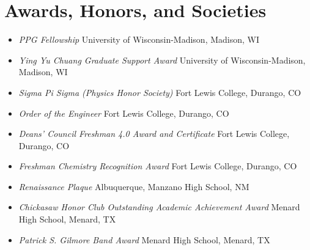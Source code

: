 \section{Awards, Honors, and Societies}

\begin{itemize}
    \item \textit{PPG Fellowship} \hfill University of Wisconsin-Madison, Madison, WI
    \item \textit{Ying Yu Chuang Graduate Support Award} \hfill University of Wisconsin-Madison, Madison, WI
    \item \textit{Sigma Pi Sigma (Physics Honor Society)} \hfill Fort Lewis College, Durango, CO
    \item \textit{Order of the Engineer} \hfill Fort Lewis College, Durango, CO
    \item \textit{Deans' Council Freshman 4.0 Award and Certificate} \hfill Fort Lewis College, Durango, CO
    \item \textit{Freshman Chemistry Recognition Award} \hfill Fort Lewis College, Durango, CO
    \item \textit{Renaissance Plaque} \hfill Albuquerque, Manzano High School, NM
    \item \textit{Chickasaw Honor Club Outstanding Academic Achievement Award} \hfill Menard High School, Menard, TX
    \item \textit{Patrick S. Gilmore Band Award} \hfill Menard High School, Menard, TX
\end{itemize}
